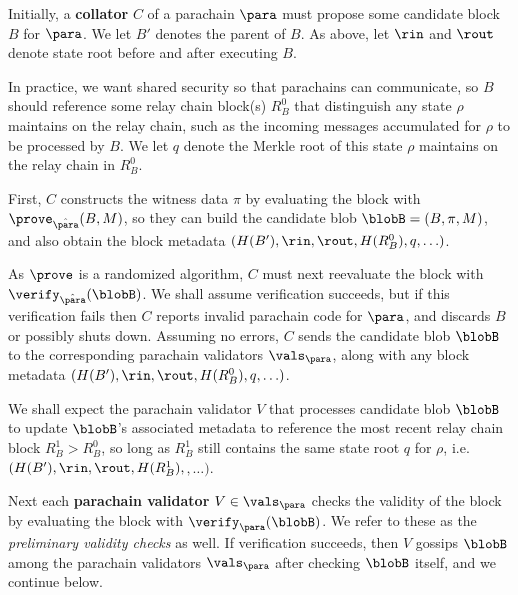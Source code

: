 \smallskip

Initially, a {\bf collator} $C$ of a parachain $\para$ must propose some candidate block $B$ for $\para$.  We let $B'$ denotes the parent of $B$.  As above, let $\rin$ and $\rout$ denote state root before and after executing $B$.  

In practice, we want shared security so that parachains can communicate, so $B$ should reference some relay chain block(s) $R^0_B$ that distinguish any state $\rho$ maintains on the relay chain, such as the incoming messages accumulated for $\rho$ to be processed by $B$.  We let $q$ denote the Merkle root of this state $\rho$ maintains on the relay chain in $R^0_B$.
 
First, $C$ constructs the witness data $\pi$ by evaluating the block with $\prove_{\hat{\para}}(B,M)$, so they can build the candidate blob $\blobB = (B,\pi,M)$, and also obtain the block metadata $(H(B'),\rin,\rout,H(R^0_B),q,\ldots)$. 

As $\prove$ is a randomized algorithm, $C$ must next reevaluate the block with $\verify_{\hat{\para}}(\blobB)$.  We shall assume verification succeeds, but if this verification fails then $C$ reports invalid parachain code for $\para$, and discards $B$ or possibly shuts down.  Assuming no errors, $C$ sends the candidate blob $\blobB$ to the corresponding parachain validators $\vals_\para$, along with any block metadata $(H(B'),\rin,\rout,H(R^0_B),q,\ldots)$. 

\smallskip

We shall expect the parachain validator $V$ that processes candidate blob $\blobB$ to update $\blobB$'s associated metadata to reference the most recent relay chain block $R^1_B > R^0_B$, so long as $R^1_B$ still contains the same state root $q$ for $\rho$, 
i.e.\ $(H(B'),\rin,\rout,H(R^1_B),$$,\ldots)$.

Next each {\bf parachain validator} $V \in \vals_\para$ checks the validity of the block by evaluating the block with $\verify_\para(\blobB)$.  We refer to these as the {\em preliminary validity checks} as well.  If verification succeeds, then $V$ gossips $\blobB$ among the parachain validators $\vals_\para$ after checking $\blobB$ itself, and we continue below.

